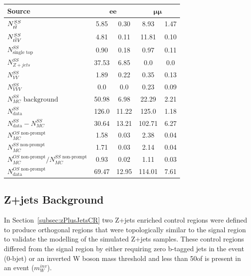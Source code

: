 \begin{table}[h]
\centering
\begin{tabular}{l | S @{${}\pm{}$} S S  @{${}\pm{}$} S}
\hline
\textbf{Source} &  &   \\ 
\hline
$N_{t\overline{t}}^{SS}$ & 5.85 & 0.30 & 8.93 & 1.47    \\
$N_{t\overline{t} V}^{SS}$ & 4.81 & 0.11 & 11.81 & 0.10  \\ 
$N_{\textrm{single top}}^{SS}$ & 0.90 & 0.18 & 0.97 & 0.11    \\
$N_{Z+jets}^{SS}$ & 37.53 & 6.85 & 0.0 & 0.0  \\
$N_{VV}^{SS}$ & 1.89 & 0.22 & 0.35 & 0.13 \\
$N_{VVV}^{SS}$ & 0.0 & 0.0 & 0.23 & 0.09 \\
\hline
$N_{MC}^{SS} \textrm{ background}$ & 50.98 & 6.98 & 22.29 & 2.21 \\ 
$N_{\textrm{data}}^{SS}$ & 126.0 & 11.22 & 125.0 & 1.18 \\ 
\hline
$N_{\textrm{data}}^{SS} - N_{MC}^{SS}$ & 30.64 & 13.21 & 102.71 & 6.27 \\
\hline
$N_{MC}^{OS\textrm{ non-prompt}}$ & 1.58 & 0.03 & 2.38 & 0.04 \\
$N_{MC}^{SS\textrm{ non-prompt}}$ & 1.71 & 0.03 & 2.14 & 0.04 \\
$N_{MC}^{OS\textrm{ non-prompt}}/N_{MC}^{SS \textrm{ non-prompt}}$ & 0.93 & 0.02 & 1.11 & 0.03 \\
\hline
$N_{\textrm{data}}^{OS\textrm{ non-prompt}}$ & 69.47 & 12.95 & 114.01 & 7.61 \\
\hline
\end{tabular}
\label{tab:fakeLeptonYields}
\end{table}


\subsection{Z+jets Background}\label{subsec:zPlusJetsEstimation}
In Section~\ref{subsec:zPlusJetsCR} two Z+jets enriched control regions were defined to produce orthogonal regions that were topologically similar to the signal region to validate the modelling of the simulated Z+jets samples.
These control regions differed from the signal region by either requiring zero b-tagged jets in the event (0-bjet) or an inverted W boson mass threshold and less than 50\GeV of \MET is present in an event ($m_{W}^{inv}$).

